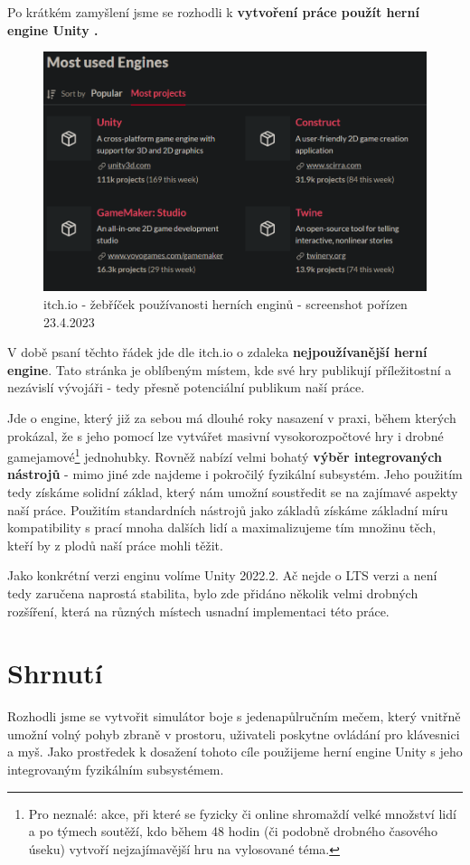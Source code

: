 \bigbreak
Po krátkém zamyšlení jsme se rozhodli k \textbf{vytvoření práce použít herní engine Unity \cite{Unity}.} 
\begin{figure}[h]\centering
    \center
    \includegraphics[width=140mm]{../img/Itch-mostUsedEngines.png}
    \caption{itch.io - žebříček používanosti herních enginů - screenshot pořízen 23.4.2023}
    \label{obr02:itchIoEngines}
    
\end{figure}

V době psaní těchto řádek jde dle itch.io \cite{ItchIo} o zdaleka \textbf{nejpoužívanější herní engine}. Tato stránka je oblíbeným místem, kde své hry publikují příležitostní a nezávislí vývojáři - tedy přesně potenciální publikum naší práce. 

Jde o engine, který již za sebou má dlouhé roky nasazení v praxi, během kterých prokázal, že s jeho pomocí lze vytvářet masivní vysokorozpočtové hry i drobné gamejamové\footnote{Pro neznalé: akce, při které se fyzicky či online shromaždí velké množství lidí a po týmech soutěží, kdo během 48 hodin (či podobně drobného časového úseku) vytvoří nejzajímavější hru na vylosované téma.} jednohubky. Rovněž nabízí velmi bohatý \textbf{výběr integrovaných nástrojů} - mimo jiné zde najdeme i pokročilý fyzikální subsystém. Jeho použitím tedy získáme solidní základ, který nám umožní soustředit se na zajímavé aspekty naší práce. Použitím standardních nástrojů jako základů získáme základní míru kompatibility s prací mnoha dalších lidí a maximalizujeme tím množinu těch, kteří by z plodů naší práce mohli těžit.

Jako konkrétní verzi enginu volíme Unity 2022.2. Ač nejde o \acs{LTS} verzi a není tedy zaručena naprostá stabilita, bylo zde přidáno několik velmi drobných rozšíření, která na různých místech usnadní implementaci této práce.  

\section{Shrnutí}
Rozhodli jsme se vytvořit simulátor boje s jedenapůlručním mečem, který vnitřně umožní volný pohyb zbraně v prostoru, uživateli poskytne ovládání pro klávesnici a myš. Jako prostředek k dosažení tohoto cíle použijeme herní engine Unity \cite{Unity} s jeho integrovaným fyzikálním subsystémem. 
